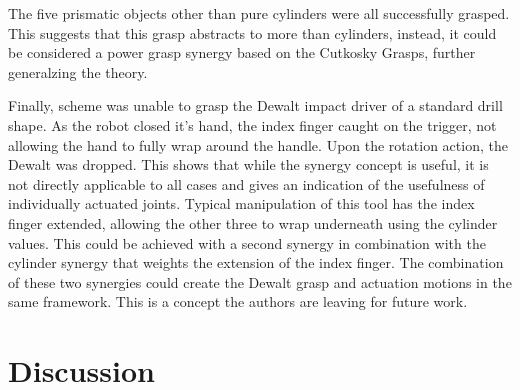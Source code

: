 \documentclass[letterpaper, 10 pt, conference]{ieeeconf}  %
\begin{document}
The five prismatic objects other than pure cylinders were all successfully grasped. This suggests that this grasp abstracts to more than cylinders, instead, it could be considered a power grasp synergy based on the Cutkosky Grasps, further generalzing the theory. 

Finally, scheme was unable to grasp the Dewalt impact driver of a standard drill shape. As the robot closed it's hand, the index finger caught on the trigger, not allowing the hand to fully wrap around the handle. Upon the rotation action, the Dewalt was dropped. This shows that while the synergy concept is useful, it is not directly applicable to all cases and gives an indication of the usefulness of individually actuated joints. Typical manipulation of this tool has the index finger extended, allowing the other three to wrap underneath using the cylinder values. This could be achieved with a second synergy in combination with the cylinder synergy that weights the extension of the index finger. The combination of these two synergies could create the Dewalt grasp and actuation motions in the same framework. This is a concept the authors are leaving for future work. 


\section{Discussion}
\end{document}
